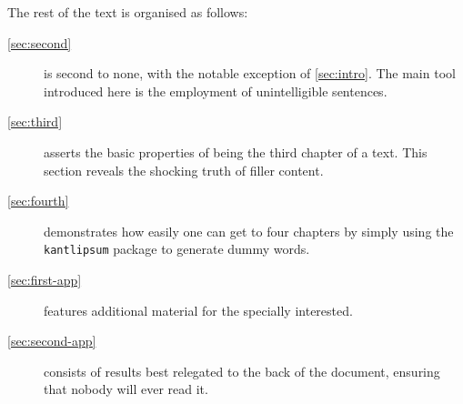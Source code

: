 The rest of the text is organised as follows:
\begin{description}
    \item[\cref{sec:second}]
    is second to none, with the notable exception of \cref{sec:intro}.
    The main tool introduced here is the employment of unintelligible sentences.

    \item[\cref{sec:third}]
    asserts the basic properties of being the third chapter of a text.
    This section reveals the shocking truth of filler content.

    \item[\cref{sec:fourth}]
    demonstrates how easily one can get to four chapters by simply using the \texttt{kantlipsum} package to generate dummy words.

    \item[\cref{sec:first-app}]
    features additional material for the specially interested.

    \item[\cref{sec:second-app}]
    consists of results best relegated to the back of the document,
    ensuring that nobody will ever read it.
\end{description}